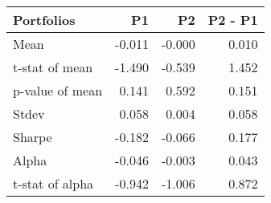 \begin{tabular}{lrrr}
\toprule
Portfolios & P1 & P2 & P2 - P1 \\
\midrule
Mean & -0.011 & -0.000 & 0.010 \\
t-stat of mean & -1.490 & -0.539 & 1.452 \\
p-value of mean & 0.141 & 0.592 & 0.151 \\
Stdev & 0.058 & 0.004 & 0.058 \\
Sharpe & -0.182 & -0.066 & 0.177 \\
Alpha & -0.046 & -0.003 & 0.043 \\
t-stat of alpha & -0.942 & -1.006 & 0.872 \\
\bottomrule
\end{tabular}
